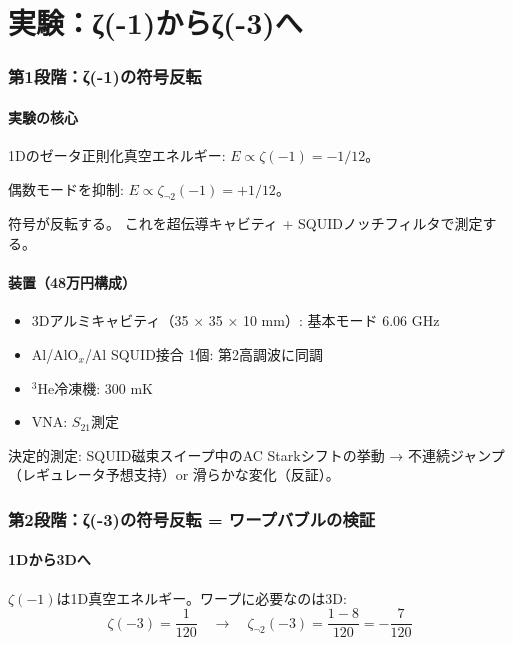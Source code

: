 \documentclass[11pt,a4paper]{article}
\begin{document}
\part{実験：ζ(-1)からζ(-3)へ}

\section{第1段階：ζ(-1)の符号反転}

\subsection{実験の核心}

1Dのゼータ正則化真空エネルギー:
$E \propto \zeta(-1) = -1/12$。

偶数モードを抑制: $E \propto \zeta_{\neg 2}(-1) = +1/12$。

符号が反転する。
これを超伝導キャビティ + SQUIDノッチフィルタで測定する。

\subsection{装置（48万円構成）}

\begin{itemize}
\item 3Dアルミキャビティ（35 × 35 × 10 mm）: 基本モード 6.06 GHz
\item Al/AlO$_x$/Al SQUID接合 1個: 第2高調波に同調
\item $^3$He冷凍機: 300 mK
\item VNA: $S_{21}$測定
\end{itemize}

決定的測定: SQUID磁束スイープ中のAC Starkシフトの挙動
→ 不連続ジャンプ（レギュレータ予想支持）or 滑らかな変化（反証）。

\section{第2段階：ζ(-3)の符号反転 = ワープバブルの検証}

\subsection{1Dから3Dへ}

$\zeta(-1)$は1D真空エネルギー。ワープに必要なのは3D:
$$\zeta(-3) = \frac{1}{120} \quad \to \quad \zeta_{\neg 2}(-3) = \frac{1-8}{120} = -\frac{7}{120}$$
\end{document}
